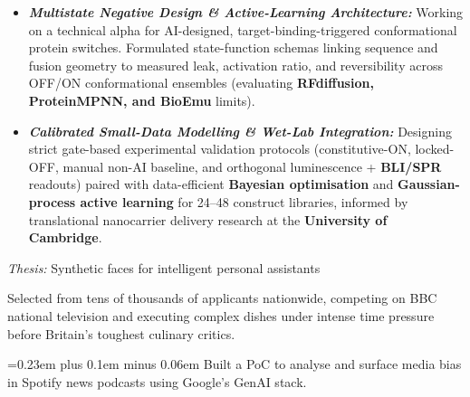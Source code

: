 \vspace{-3pt}
\begin{itemize}
\item \textbf{\textit{Multistate Negative Design \& Active-Learning Architecture:}} Working on a technical alpha for AI-designed, target-binding-triggered conformational protein switches. Formulated state-function schemas linking sequence and fusion geometry to measured leak, activation ratio, and reversibility across OFF/ON conformational ensembles (evaluating \textbf{RFdiffusion, ProteinMPNN, and BioEmu} limits).
\item \textbf{\textit{Calibrated Small-Data Modelling \& Wet-Lab Integration:}} Designing strict gate-based experimental validation protocols (constitutive-ON, locked-OFF, manual non-AI baseline, and orthogonal luminescence + \textbf{BLI/SPR} readouts) paired with data-efficient \textbf{Bayesian optimisation} and \textbf{Gaussian-process active learning} for 24--48 construct libraries, informed by translational nanocarrier delivery research at the \textbf{University of Cambridge}.
\end{itemize}

{\small\textit{Thesis:} Synthetic faces for intelligent personal assistants\par}

\smallskip
{}


Selected from tens of thousands of applicants nationwide, competing on BBC national television and executing complex dishes under intense time pressure before Britain's toughest culinary critics.

\smallskip

{\spaceskip=0.23em plus 0.1em minus 0.06em Built a PoC to analyse and surface media bias in Spotify news podcasts using Google's GenAI stack.\par}

\smallskip

